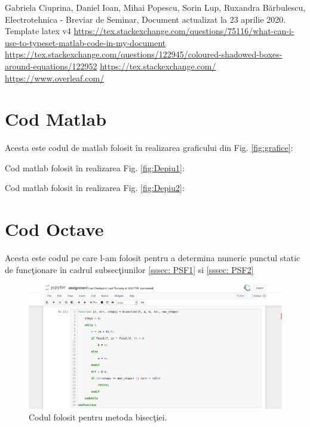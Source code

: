 \documentclass[multi=false, tikz, border=2mm]{article}
\newcommand\tab[1][0.6cm]{\hspace*{#1}}
\begin{document}
\begin{thebibliography}{99}
	Gabriela Ciuprina, Daniel Ioan, Mihai Popescu, Sorin Lup, Ruxandra B\u{a}rbulescu, Electrotehnica - Breviar de Seminar, Document actualizat la 23 aprilie 2020.
	 Template latex v4
	{\href{https://tex.stackexchange.com/questions/75116/what-can-i-use-to-typeset-matlab-code-in-my-document}{https://tex.stackexchange.com/questions/75116/what-can-i-use-to-typeset-matlab-code-in-my-document}}
	{\href{https://tex.stackexchange.com/questions/122945/coloured-shadowed-boxes-around-equations/122952}{https://tex.stackexchange.com/questions/122945/coloured-shadowed-boxes-around-equations/122952}}
	{\href{https://tex.stackexchange.com/}{https://tex.stackexchange.com/}}
	{\href{https://www.overleaf.com/}{https://www.overleaf.com/}}
\end{thebibliography}

\pagebreak
	
\begin{appendix}
\section{Cod Matlab}
\label{sec:codMatlab}

Acesta este codul de matlab folosit \^{i}n realizarea graficului din Fig. \ref{fig:grafice}:



\pagebreak
Cod matlab folosit \^{i}n realizarea Fig. \ref{fig:Depiu1}:

Cod matlab folosit \^{i}n realizarea Fig. \ref{fig:Depiu2}:


\pagebreak

\section{Cod Octave}
\label{sec:codOctave}
\tab Acesta este codul pe care l-am folosit pentru a determina numeric punctul static de func\c{t}ionare \^{i}n cadrul subsec\c{t}iunilor \ref{sssec: PSF1} si \ref{sssec: PSF2}
	\begin{figure}[H]
	\includegraphics[trim = 220 0 520 125, clip, scale=0.6]{CodBisectie}
	\caption{Codul folosit pentru metoda bisec\c{t}iei.}
	\label{fig: CodBisectie}
	\end{figure}
\end{appendix}
\end{document}
